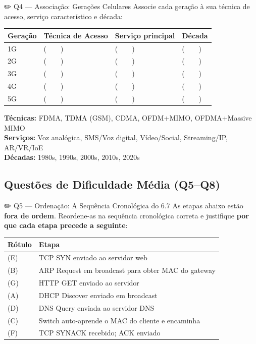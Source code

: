 \documentclass[11pt,a4paper]{article}
\begin{document}
\begin{questao}{✏️ Q4 --- Associação: Gerações Celulares}
Associe cada geração à sua técnica de acesso, serviço característico e década:

\begin{center}
\begin{tabular}{llll}
\toprule
\textbf{Geração} & \textbf{Técnica de Acesso} & \textbf{Serviço principal} & \textbf{Década} \\
\midrule
1G & (~~~~) & (~~~~) & (~~~~) \\
2G & (~~~~) & (~~~~) & (~~~~) \\
3G & (~~~~) & (~~~~) & (~~~~) \\
4G & (~~~~) & (~~~~) & (~~~~) \\
5G & (~~~~) & (~~~~) & (~~~~) \\
\bottomrule
\end{tabular}
\end{center}

\textbf{Técnicas:} FDMA, TDMA (GSM), CDMA, OFDM+MIMO, OFDMA+Massive MIMO \\
\textbf{Serviços:} Voz analógica, SMS/Voz digital, Vídeo/Social, Streaming/IP, AR/VR/IoE \\
\textbf{Décadas:} 1980s, 1990s, 2000s, 2010s, 2020s
\end{questao}

\subsection*{Questões de Dificuldade Média (Q5--Q8)}

\begin{questao}{✏️ Q5 --- Ordenação: A Sequência Cronológica do 6.7}
As etapas abaixo estão \textbf{fora de ordem}. Reordene-as na sequência cronológica correta e justifique \textbf{por que cada etapa precede a seguinte}:

\begin{center}
\begin{tabular}{ll}
\toprule
\textbf{Rótulo} & \textbf{Etapa} \\
\midrule
(E) & TCP SYN enviado ao servidor web \\
(B) & ARP Request em broadcast para obter MAC do gateway \\
(G) & HTTP GET enviado ao servidor \\
(A) & DHCP Discover enviado em broadcast \\
(D) & DNS Query enviada ao servidor DNS \\
(C) & Switch auto-aprende o MAC do cliente e encaminha \\
(F) & TCP SYNACK recebido; ACK enviado \\
\bottomrule
\end{tabular}
\end{center}
\end{questao}
\end{document}
